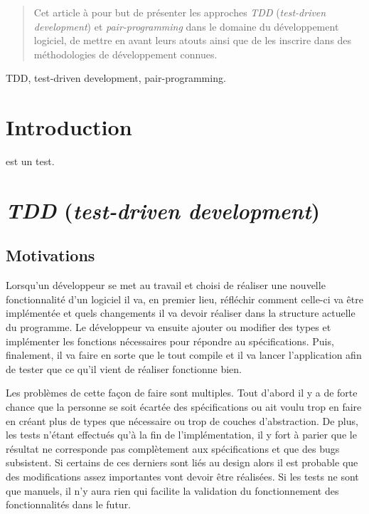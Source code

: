 \documentclass[journal, a4paper]{IEEEtran}
\begin{document}


\maketitle


\begin{abstract}
Cet article à pour but de présenter les approches \emph{TDD} (\emph{test-driven development}) et \emph{pair-programming} dans le domaine du développement logiciel, de mettre en avant leurs atouts ainsi que de les inscrire dans des méthodologies de développement connues.
\end{abstract}

\begin{IEEEkeywords}
TDD, test-driven development, pair-programming.
\end{IEEEkeywords}

\IEEEpeerreviewmaketitle

\section{Introduction}

 est un test.

\section{\emph{TDD} (\emph{test-driven development})}

\subsection{Motivations}

Lorsqu'un développeur se met au travail et choisi de réaliser une nouvelle fonctionnalité d'un logiciel il va, en premier lieu, réfléchir comment celle-ci va être implémentée et quels changements il va devoir réaliser dans la structure actuelle du programme. Le développeur va ensuite ajouter ou modifier des types et implémenter les fonctions nécessaires pour répondre au spécifications. Puis, finalement, il va faire en sorte que le tout compile et il va lancer l'application afin de tester que ce qu'il vient de réaliser fonctionne bien.

Les problèmes de cette façon de faire sont multiples. Tout d'abord il y a de forte chance que la personne se soit écartée des spécifications ou ait voulu trop en faire en créant plus de types que nécessaire ou trop de couches d'abstraction. De plus, les tests n'étant effectués qu'à la fin de l'implémentation, il y fort à parier que le résultat ne corresponde pas complètement aux spécifications et que des bugs subsistent. Si certains de ces derniers sont liés au design alors il est probable que des modifications assez importantes vont devoir être réalisées. Si les tests ne sont que manuels, il n'y aura rien qui facilite la validation du fonctionnement des fonctionnalités dans le futur.
\end{document}
